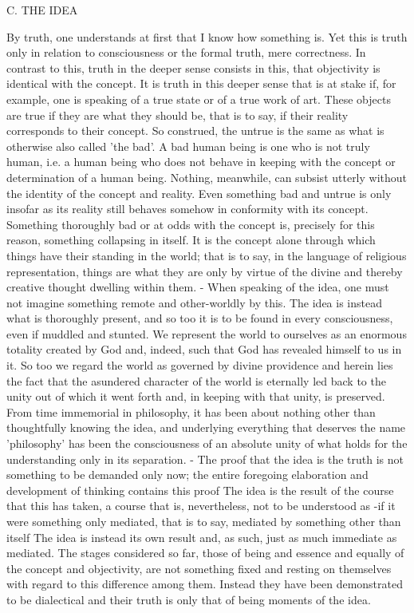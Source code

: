 C. THE IDEA

By truth, one understands at first that I know how something is.
Yet this is truth only in relation to consciousness or the formal truth, mere correctness.
In contrast to this, truth in the deeper sense consists in this,
that objectivity is identical with the concept.
 It is truth in this deeper sense that is
at stake if, for example, one is speaking of a true state or of a true work of art.
These objects are true if they are what they should be, that is to
say, if their reality corresponds to their concept.
So construed, the untrue is the
same as what is otherwise also called 'the bad'.
A bad human being is one who is not truly human, i.e. a human being who does not
behave in keeping with the concept or determination of a human being.
 Nothing, meanwhile, can subsist
utterly without the identity of the concept and reality. Even something bad and
untrue is only insofar as its reality still behaves somehow in conformity with its
concept. Something thoroughly bad or at odds with the concept is, precisely for
this reason, something collapsing in itself. It is the concept alone through which
things have their standing in the world; that is to say, in the language of religious
representation, things are what they are only by virtue of the divine and thereby
creative thought dwelling within them. - When speaking of the idea, one must
not imagine something remote and other-worldly by this. The idea is instead what
is thoroughly present, and so too it is to be found in every consciousness, even
if muddled and stunted. We represent the world to ourselves as an enormous
totality created by God and, indeed, such that God has revealed himself to us in
it. So too we regard the world as governed by divine providence and herein lies the
fact that the asundered character of the world is eternally led back to
the unity out of which it went forth and, in keeping with that unity, is preserved.
From time immemorial in philosophy, it has been about nothing other than
thoughtfully knowing the idea, and underlying everything that deserves the name
'philosophy' has been the consciousness of an absolute unity of what holds for
the understanding only in its separation. - The proof that the idea is the truth
is not something to be demanded only now; the entire foregoing elaboration and
development of thinking contains this proof The idea is the result of the course
that this has taken, a course that is, nevertheless, not to be understood as -if it
were something only mediated, that is to say, mediated by something other than
itself The idea is instead its own result and, as such, just as much immediate as
mediated. The stages considered so far, those of being and essence and equally
of the concept and objectivity, are not something fixed and resting on themselves
with regard to this difference among them. Instead they have been demonstrated
to be dialectical and their truth is only that of being moments of the idea.

